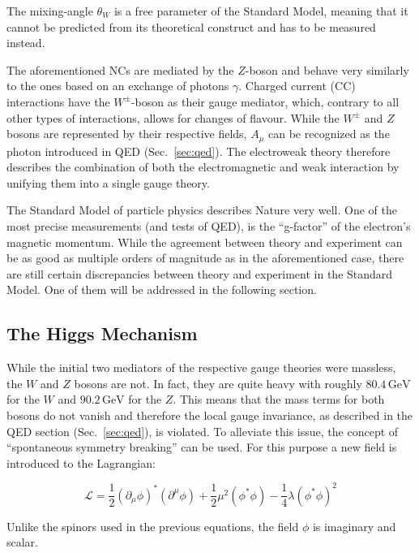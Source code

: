 \noindent The mixing-angle $\theta_W$ is a free parameter of the Standard Model, meaning that it cannot be predicted from its theoretical construct and has to be measured instead.

The aforementioned NCs are mediated by the $Z$-boson and behave very similarly to the ones based on an exchange of photons $\gamma$. Charged current (CC) interactions have the $W^\pm$-boson as their gauge mediator, which, contrary to all other types of interactions, allows for changes of flavour. While the $W^\pm$ and $Z$ bosons are represented by their respective fields, $A_\mu$ can be recognized as the photon introduced in QED (Sec.~\ref{sec:qed}). The electroweak theory therefore describes the combination of both the electromagnetic and weak interaction by unifying them into a single gauge theory.

The Standard Model of particle physics describes Nature very well. One of the most precise measurements (and tests of QED), is the ``g-factor'' of the electron's magnetic momentum. While the agreement between theory and experiment can be as good as multiple orders of magnitude as in the aforementioned case, there are still certain discrepancies between theory and experiment in the Standard Model. One of them will be addressed in the following section.

\subsection{The Higgs Mechanism}
\label{sec:higgs}

While the initial two mediators of the respective gauge theories were massless, the $W$ and $Z$ bosons are not. In fact, they are quite heavy with roughly $80.4\,\text{GeV}$ for the $W$ and $90.2\,\text{GeV}$ for the $Z$. This means that the mass terms for both bosons do not vanish and therefore the local gauge invariance, as described in the QED section (Sec.~\ref{sec:qed}), is violated. To alleviate this issue, the concept of ``spontaneous symmetry breaking'' can be used. For this purpose a new field is introduced to the Lagrangian:

\begin{equation}
  \label{eq:higgslagrangian}
  \mathcal{L} =  \frac{1}{2} (\partial_\mu \phi)^* (\partial^\mu \phi)  + \frac{1}{2} \mu^2 (\phi^* \phi) - \frac{1}{4} \lambda (\phi^* \phi)^2
\end{equation}

\noindent Unlike the spinors used in the previous equations, the field $\phi$ is imaginary and scalar.

